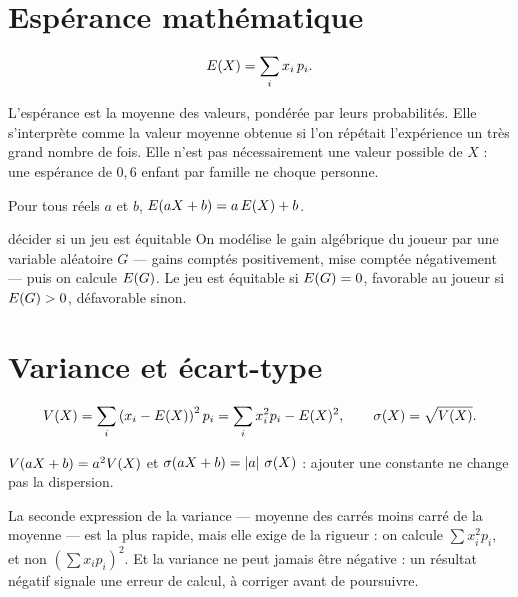 \section{Espérance mathématique}

\begin{definition}[espérance]
\[
  E(X) = \sum_{i} x_{i}\,p_{i} .
\]
\end{definition}

\begin{remarque}
L'espérance est la moyenne des valeurs, pondérée par leurs probabilités. Elle
s'interprète comme la valeur moyenne obtenue si l'on répétait l'expérience un
très grand nombre de fois. Elle n'est pas nécessairement une valeur possible
de $X$ : une espérance de $0{,}6$ enfant par famille ne choque personne.
\end{remarque}

\begin{propriete}[linéarité]
Pour tous réels $a$ et $b$, $E(aX+b) = a\,E(X)+b$.
\end{propriete}

\begin{methode}{décider si un jeu est équitable}
On modélise le gain algébrique du joueur par une variable aléatoire $G$ —
gains comptés positivement, mise comptée négativement — puis on calcule
$E(G)$. Le jeu est équitable si $E(G) = 0$, favorable au joueur si
$E(G)>0$, défavorable sinon.
\end{methode}

\section{Variance et écart-type}

\begin{definition}
\[
  V(X) = \sum_{i}\left(x_{i}-E(X)\right)^{2}p_{i}
          = \sum_{i}x_{i}^{2}p_{i}-E(X)^{2},
  \qquad
  \sigma(X) = \sqrt{V(X)} .
\]
\end{definition}

\begin{propriete}
$V(aX+b) = a^{2}V(X)$ et $\sigma(aX+b) = \left|a\right|\,\sigma(X)$ : ajouter
une constante ne change pas la dispersion.
\end{propriete}

\begin{avertissement}
La seconde expression de la variance — moyenne des carrés moins carré de la
moyenne — est la plus rapide, mais elle exige de la rigueur : on calcule
$\sum x_{i}^{2}p_{i}$, et non $\left(\sum x_{i}p_{i}\right)^{2}$. Et la
variance ne peut jamais être négative : un résultat négatif signale une erreur
de calcul, à corriger avant de poursuivre.
\end{avertissement}

